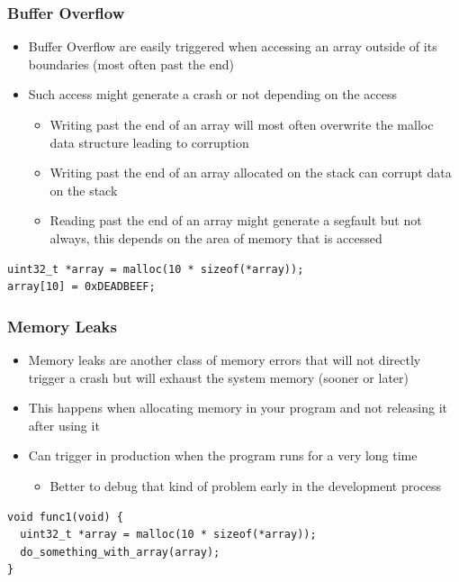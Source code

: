 \begin{frame}[fragile]
  \frametitle{Buffer Overflow}
  \begin{itemize}
    \item Buffer Overflow are easily triggered when accessing an array outside
          of its boundaries (most often past the end)
    \item Such access might generate a crash or not depending on the access
    \begin{itemize}
      \item Writing past the end of an  array will most often
            overwrite the malloc data structure leading to corruption
      \item Writing past the end of an array allocated on the stack can corrupt
            data on the stack
      \item Reading past the end of an array might generate a segfault but not
            always, this depends on the area of memory that is accessed
    \end{itemize}
  \end{itemize}
  \vspace{0.2cm}
  \begin{block}{}
    \begin{verbatim}
uint32_t *array = malloc(10 * sizeof(*array));
array[10] = 0xDEADBEEF;
    \end{verbatim}
  \end{block}
\end{frame}

\begin{frame}[fragile]
  \frametitle{Memory Leaks}
  \begin{itemize}
    \item Memory leaks are another class of memory errors that will not directly
          trigger a crash but will exhaust the system memory (sooner or later)
    \item This happens when allocating memory in your program and not releasing
          it after using it
    \item Can trigger in production when the program runs for a very long time
    \begin{itemize}
      \item Better to debug that kind of problem early in the development
            process
    \end{itemize}
  \end{itemize}
  \vspace{0.2cm}
  \begin{block}{}
    \begin{verbatim}
void func1(void) {
  uint32_t *array = malloc(10 * sizeof(*array));
  do_something_with_array(array);
}
    \end{verbatim}
  \end{block}
\end{frame}

